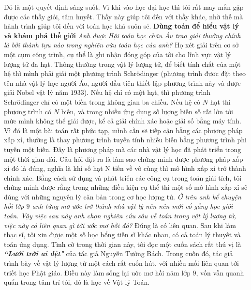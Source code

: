 \begin{multicols}{2}
	\vskip 0.1cm
	Đó là một quyết định sáng suốt. Vì khi vào học đại học thì tôi rất may mắn gặp được các thầy giỏi, tâm huyết. Thầy này giúp tôi đến với thầy khác, nhờ thế mà hành trình giúp tôi đến với toán học khá suôn sẻ. 
	\vskip 0.1cm
	\textbf{\color{diendantoanhoc}Dùng toán để hiểu vật lý và khám phá thế giới}
	\vskip 0.1cm 
	\textit{Anh được Hội toán học châu Âu trao giải thưởng chính là bởi thành tựu nào trong nghiên cứu toán học của anh?}
	\vskip 0.1cm 
	Họ xét giải trên cơ sở một cụm công trình, cụ thể là ghi nhận đóng góp của tôi cho lĩnh vực vật lý lượng tử đa hạt. Thông thường trong vật lý lượng tử, để biết tính chất của một hệ thì mình phải giải một phương trình Schrödinger (phương trình đươc đặt theo tên nhà vật lý học người Áo, người đầu tiên thiết lập phương trình này và được giải Nobel vật lý năm $1933$). Nếu hệ chỉ có một hạt, thì phương trình Schrödinger chỉ có một biến trong không gian ba chiều. Nếu hệ có $N$ hạt thì phương trình có $N$ biến, và trong nhiều ứng dụng số lượng biến số rất lớn tới mức mình không thể giải được, kể cả giải chính xác hoặc giải số bằng máy tính. 
	\vskip 0.1cm
	Vì đó là một bài toán rất phức tạp, mình cần sẽ tiếp cận bằng các phương pháp xấp xỉ, thường là thay phương trình tuyến tính nhiều biến bằng phương trình phi tuyến một biến. Đây là phương pháp mà các nhà vật lý học đã phát triển trong một thời gian dài. Câu hỏi đặt ra là làm sao chứng minh được phương pháp xấp xỉ đó là đúng, nghĩa là khi số hạt N tiến về vô cùng thì mô hình xấp xỉ trở thành chính xác. Bằng cách sử dụng và phát triển các công cụ trong toán giải tích, tôi chứng minh được rằng trong những điều kiện cụ thể thì một số mô hình xấp xỉ sẽ đúng với những nguyên lý căn bản trong cơ học lượng tử. 
	\vskip 0.1cm
	\textit{Ở trên anh kể chuyện hồi lớp $9$ anh từng mơ ước trở thành nhà vật lý nên nên mới cố gắng học giỏi toán. Vậy việc sau này anh chọn nghiên cứu sâu về toán trong vật lý lượng tử, việc này có liên quan gì tới ước mơ hồi đó?}
	\vskip 0.1cm 
	Đúng là có liên quan. Sau khi làm thạc sĩ, tôi xin được một số học bổng tiến sĩ khác nhau, có cả toán lý thuyết và toán ứng dụng. Tình cờ trong thời gian này, tôi đọc một cuốn sách rất thú vị là \textbf{\color{diendantoanhoc}\textit{``Lưới trời ai dệt"}} của tác giả Nguyễn Tường Bách. Trong cuốn đó, tác giả trình bày về vật lý lượng tử một cách rất cuốn hút, với nhiều mối liên quan tới triết học Phật giáo. Điều này làm sống lại uớc mơ hồi năm lớp $9$, vốn vẫn quanh quẩn trong tâm trí tôi, đó là học về Vật lý Toán.  

\end{multicols}

